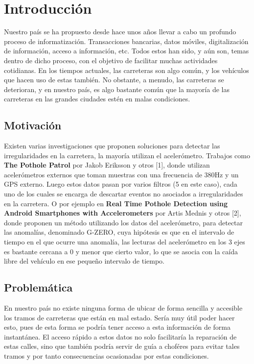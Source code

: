 \chapter*{Introducción}\label{chapter:introduction}

Nuestro país se ha propuesto desde hace unos años llevar a cabo un profundo proceso de informatización. Transacciones bancarias, datos móviles, digitalización de información, acceso a información, etc. Todos estos han sido, y aún son, temas dentro de dicho proceso, con el objetivo de facilitar muchas actividades cotidianas. En los tiempos actuales, las carreteras son algo común, y los vehículos que hacen uso de estas también. No obstante, a menudo, las carreteras se deterioran, y en nuestro país, es algo bastante común que la mayoría de las carreteras en las grandes ciudades estén en malas condiciones.

\section*{Motivación}
Existen varias investigaciones que proponen soluciones para detectar las irregularidades en la carretera, la mayoría utilizan el acelerómetro. Trabajos como \textbf{The Pothole Patrol} por Jakob Eriksson y otros [1], donde utilizan acelerómetros externos que toman muestras con una frecuencia de 380Hz y un GPS externo. Luego estos datos pasan por varios filtros (5 en este caso), cada uno de los cuales se encarga de descartar eventos no asociados a irregularidades en la carretera. O por ejemplo en \textbf{Real Time Pothole Detection using Android Smartphones with Accelerometers} por Artis Mednis y otros [2], donde proponen un método utilizando los datos del acelerómetro, para detectar las anomalías, denominado G-ZERO, cuya hipótesis es que en el intervalo de tiempo en el que ocurre una anomalía, las lecturas del acelerómetro en los 3 ejes es bastante cercana a 0 y menor que cierto valor, lo que se asocia con la caída libre del vehículo en ese pequeño intervalo de tiempo.

\section*{Problemática}
En nuestro país no existe ninguna forma de ubicar de forma sencilla y accesible los tramos de carreteras que están en mal estado. Sería muy útil poder hacer esto, pues de esta forma se podría tener acceso a esta información de forma instantánea. El acceso rápido a estos datos no solo facilitaría la reparación de estas calles, sino que también podría servir de guía a choféres para evitar tales tramos y por tanto consecuencias ocasionadas por estas condiciones.

